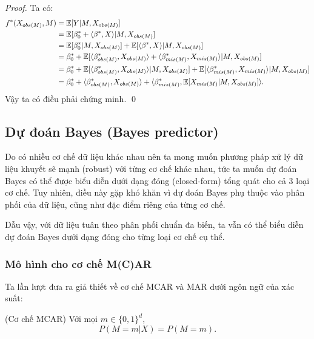 \begin{proof} Ta có:
    \begin{equation*}
        \begin{split}
        f^* (X_{obs(M)}, M) 
        &= \mathbb{E} [Y | M, X_{\text{obs}(M)}] \\
        &= \mathbb{E} [\beta_0^* + \langle \beta^*, X \rangle | M, X_{obs(M)}] \\
        &= \mathbb{E} [\beta_0^* | M, X_{obs(M)}] + \mathbb{E} [\langle \beta^*, X \rangle | M, X_{obs(M)}] \\
        &= \beta_0^* + \mathbb{E} [ \langle \beta_{obs(M)}^*, X_{obs(M)} \rangle + \langle \beta_{mis(M)}^*, X_{mis(M)} \rangle | M, X_{obs(M)}] \\
        &= \beta_0^* + \mathbb{E} [\langle \beta_{obs(M)}^*, X_{obs(M)} \rangle | M , X_{obs(M)}] + \mathbb{E} [\langle \beta_{mis(M)}^*, X_{mis(M)} \rangle | M , X_{obs(M)}] \\
        &= \beta_{0}^{*} + \langle\beta_{obs(M)}^{*}, X_{obs(M)}\rangle 
        + \langle\beta_{mis(M)}^{*}, \mathbb{E} [X_{mis(M)} | M, X_{obs(M)}] \rangle. 
        \end{split} 
    \end{equation*} 
    Vậy ta có điều phải chứng minh. \qed
\end{proof}


\subsection{Dự đoán Bayes (Bayes predictor)}

Do có nhiều cơ chế dữ liệu khác nhau nên ta mong muốn phương pháp xử lý dữ liệu khuyết sẽ mạnh (robust) với từng cơ chế khác nhau, 
tức ta muốn dự đoán Bayes có thể được biểu diễn dưới dạng đóng (closed-form) tổng quát cho cả 3 loại cơ chế. 
Tuy nhiên, điều này gặp khó khăn
vì dự đoán Bayes phụ thuộc vào phân phối của dữ liệu, cũng như đặc điểm riêng của từng cơ chế.

Dẫu vậy, với dữ liệu tuân theo phân phối chuẩn đa biến, ta vẫn có thể biểu diễn dự đoán Bayes dưới dạng đóng cho từng loại cơ chế cụ thể. 

\subsubsection{Mô hình cho cơ chế M(C)AR}

Ta lần lượt đưa ra giả thiết về cơ chế MCAR và MAR dưới ngôn ngữ của xác suất:
\begin{assume}\label{assume:mcar_assumption} (Cơ chế MCAR)
Với mọi $m \in \{0, 1\}^d$, 
    \begin{equation*}
        P(M = m | X) = P(M = m).    
    \end{equation*}
\end{assume}

